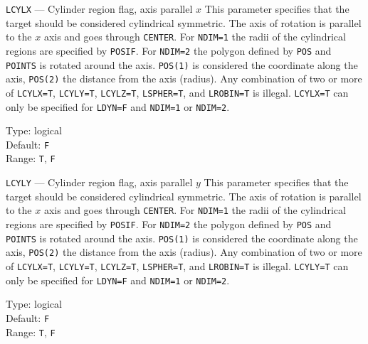 \begin{keydescription}{\texttt{LCYLX} --- Cylinder region flag, axis parallel $x$}
%
  This parameter specifies that the target should be considered cylindrical 
  symmetric. The axis of rotation is parallel to the $x$ axis and goes through 
  \texttt{CENTER}. For \texttt{NDIM=1} the radii of the 
  cylindrical regions are specified by \texttt{POSIF}. For \texttt{NDIM=2}
  the polygon defined by \texttt{POS} and \texttt{POINTS} is rotated around 
  the axis. \texttt{POS(1)} is considered the coordinate along the axis, 
  \texttt{POS(2)} the distance from the axis (radius). Any combination of two
  or more of \texttt{LCYLX=T}, \texttt{LCYLY=T}, \texttt{LCYLZ=T}, 
  \texttt{LSPHER=T}, and \texttt{LROBIN=T} is illegal. \texttt{LCYLX=T} can 
  only be specified for \texttt{LDYN=F} and \texttt{NDIM=1} or \texttt{NDIM=2}. 
  \begin{keytab}
    Type:    \> logical \\
    Default: \> \texttt{F} \\
    Range:   \> \texttt{T}, \texttt{F} 
  \end{keytab}
\end{keydescription}

\begin{keydescription}{\texttt{LCYLY} --- Cylinder region flag, axis parallel $y$}
%
  This parameter specifies that the target should be considered cylindrical 
  symmetric. The axis of rotation is parallel to the $x$ axis and goes through 
  \texttt{CENTER}. For \texttt{NDIM=1} the radii of the 
  cylindrical regions are specified by \texttt{POSIF}. For \texttt{NDIM=2}
  the polygon defined by \texttt{POS} and \texttt{POINTS} is rotated around 
  the axis. \texttt{POS(1)} is considered the coordinate along the axis, 
  \texttt{POS(2)} the distance from the axis (radius). Any combination of two
  or more of \texttt{LCYLX=T}, \texttt{LCYLY=T}, \texttt{LCYLZ=T}, 
  \texttt{LSPHER=T}, and \texttt{LROBIN=T} is illegal. \texttt{LCYLY=T} can 
  only be specified for \texttt{LDYN=F} and \texttt{NDIM=1} or \texttt{NDIM=2}.
  \begin{keytab}
    Type:    \> logical \\
    Default: \> \texttt{F} \\
    Range:   \> \texttt{T}, \texttt{F} 
  \end{keytab}
\end{keydescription}

